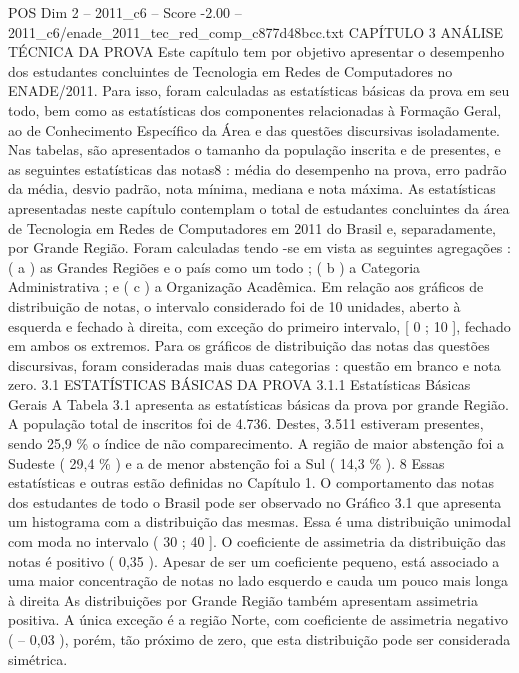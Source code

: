 \begin{textsample}{POS Dim 2 – 2011\_c6 – Score -2.00 – 2011\_c6/enade\_2011\_tec\_red\_comp\_c877d48bcc.txt}  \label{ex:f2_pos_406}
CAPÍTULO 3 ANÁLISE TÉCNICA DA PROVA Este capítulo tem por objetivo apresentar o desempenho dos estudantes concluintes de Tecnologia em Redes de Computadores no ENADE/2011.
Para isso, foram calculadas as estatísticas básicas da prova em seu todo, bem como as estatísticas dos componentes relacionadas à Formação Geral, ao de Conhecimento Específico da Área e das questões discursivas isoladamente.
Nas tabelas, são apresentados o tamanho da população inscrita e de presentes, e as seguintes estatísticas das notas8 : média do desempenho na prova, erro padrão da média, desvio padrão, nota mínima, mediana e nota máxima.
As estatísticas apresentadas neste capítulo contemplam o total de estudantes concluintes da área de Tecnologia em Redes de Computadores em 2011 do Brasil e, separadamente, por Grande Região.
Foram calculadas tendo -se em vista as seguintes agregações : ( a ) as Grandes Regiões e o país como um todo ; ( b ) a Categoria Administrativa ; e ( c ) a Organização Acadêmica.
Em relação aos gráficos de distribuição de notas, o intervalo considerado foi de 10 unidades, aberto à esquerda e fechado à direita, com exceção do primeiro intervalo, [ 0 ; 10 ], fechado em ambos os extremos.
Para os gráficos de distribuição das notas das questões discursivas, foram consideradas mais duas categorias : questão em branco e nota zero. 3.1 ESTATÍSTICAS BÁSICAS DA PROVA 3.1.1 Estatísticas Básicas Gerais A Tabela 3.1 apresenta as estatísticas básicas da prova por grande Região.
A população total de inscritos foi de 4.736.
Destes, 3.511 estiveram presentes, sendo 25,9 \% o índice de não comparecimento.
A região de maior abstenção foi a Sudeste ( 29,4 \% ) e a de menor abstenção foi a Sul ( 14,3 \% ). 8 Essas estatísticas e outras estão definidas no Capítulo 1.
O comportamento das notas dos estudantes de todo o Brasil pode ser observado no Gráfico 3.1 que apresenta um histograma com a distribuição das mesmas.
Essa é uma distribuição unimodal com moda no intervalo ( 30 ; 40 ].
O coeficiente de assimetria da distribuição das notas é positivo ( 0,35 ).
Apesar de ser um coeficiente pequeno, está associado a uma maior concentração de notas no lado esquerdo e cauda um pouco mais longa à direita As distribuições por Grande Região também apresentam assimetria positiva.
A única exceção é a região Norte, com coeficiente de assimetria negativo ( – 0,03 ), porém, tão próximo de zero, que esta distribuição pode ser considerada simétrica.

\end{textsample}
